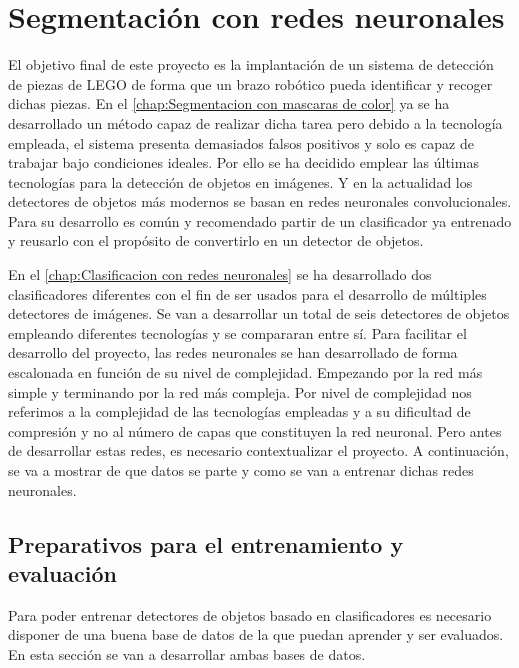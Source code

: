 \chapter{Segmentación con redes neuronales}
\label{chap:Segmentacion con redes neuronales}

El objetivo final de este proyecto es la implantación de un sistema de detección de piezas de LEGO de forma que un brazo robótico pueda identificar y recoger dichas piezas. En el \autoref{chap:Segmentacion con mascaras de color} ya se ha desarrollado un método capaz de realizar dicha tarea pero debido a la tecnología empleada, el sistema presenta demasiados falsos positivos y solo es capaz de trabajar bajo condiciones ideales. Por ello se ha decidido emplear las últimas tecnologías para la detección de objetos en imágenes. Y en la actualidad los detectores de objetos más modernos se basan en redes neuronales convolucionales. Para su desarrollo es común y recomendado partir de un clasificador ya entrenado y reusarlo con el propósito de convertirlo en un detector de objetos.

En el \autoref{chap:Clasificacion con redes neuronales} se ha desarrollado dos clasificadores diferentes con el fin de ser usados para el desarrollo de múltiples detectores de imágenes. Se van a desarrollar un total de seis detectores de objetos empleando diferentes tecnologías y se compararan entre sí. Para facilitar el desarrollo del proyecto, las redes neuronales se han desarrollado de forma escalonada en función de su nivel de complejidad. Empezando por la red más simple y terminando por la red más compleja. Por nivel de complejidad nos referimos a la complejidad de las tecnologías empleadas y a su dificultad de compresión y no al número de capas que constituyen la red neuronal. Pero antes de desarrollar estas redes, es necesario contextualizar el proyecto. A continuación, se va a mostrar de que datos se parte y como se van a entrenar dichas redes neuronales.

\section{Preparativos para el entrenamiento y evaluación}
\label{sec:Preparativos para el de entrenamiento detectores}
Para poder entrenar detectores de objetos basado en clasificadores es necesario disponer de una buena base de datos de la que puedan aprender y ser evaluados. En esta sección se van a desarrollar ambas bases de datos.

